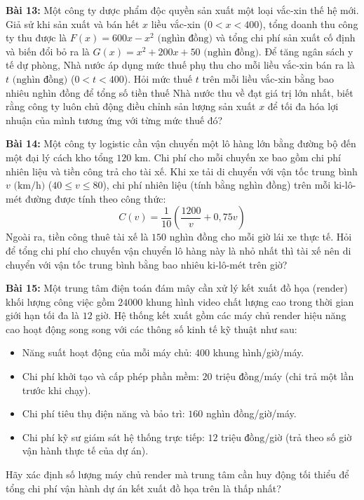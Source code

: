 \documentclass[12pt]{article}
\begin{document}
	\vspace{0.6cm}
	
	\noindent \textbf{Bài 13:} Một công ty dược phẩm độc quyền sản xuất một loại vắc-xin thế hệ mới. Giả sử khi sản xuất và bán hết $x$ liều vắc-xin ($0 < x < 400$), tổng doanh thu công ty thu được là $F(x) = 600x - x^2\text{ (nghìn đồng)}$ và tổng chi phí sản xuất cố định và biến đổi bỏ ra là $G(x) = x^2 + 200x + 50\text{ (nghìn đồng)}$. Để tăng ngân sách y tế dự phòng, Nhà nước áp dụng mức thuế phụ thu cho mỗi liều vắc-xin bán ra là $t\text{ (nghìn đồng)}$ ($0 < t < 400$). Hỏi mức thuế $t$ trên mỗi liều vắc-xin bằng bao nhiêu nghìn đồng để tổng số tiền thuế Nhà nước thu về đạt giá trị lớn nhất, biết rằng công ty luôn chủ động điều chỉnh sản lượng sản xuất $x$ để tối đa hóa lợi nhuận của mình tương ứng với từng mức thuế đó?
	\vspace{0.6cm}
	
	\noindent \textbf{Bài 14:} Một công ty logistic cần vận chuyển một lô hàng lớn bằng đường bộ đến một đại lý cách kho tổng $120\text{ km}$. Chi phí cho mỗi chuyến xe bao gồm chi phí nhiên liệu và tiền công trả cho tài xế. Khi xe tải di chuyển với vận tốc trung bình $v\text{ (km/h)}$ ($40 \le v \le 80$), chi phí nhiên liệu (tính bằng nghìn đồng) trên mỗi ki-lô-mét đường được tính theo công thức: 
	$$C(v) = \frac{1}{10}\left(\frac{1200}{v} + 0{,}75v\right)$$
	Ngoài ra, tiền công thuê tài xế là $150$ nghìn đồng cho mỗi giờ lái xe thực tế. Hỏi để tổng chi phí cho chuyến vận chuyển lô hàng này là nhỏ nhất thì tài xế nên di chuyển với vận tốc trung bình bằng bao nhiêu ki-lô-mét trên giờ?
	
	\vspace{0.6cm}
	
	\noindent \textbf{Bài 15:} Một trung tâm điện toán đám mây cần xử lý kết xuất đồ họa (render) khối lượng công việc gồm $24000$ khung hình video chất lượng cao trong thời gian giới hạn tối đa là $12$ giờ. Hệ thống kết xuất gồm các máy chủ render hiệu năng cao hoạt động song song với các thông số kinh tế kỹ thuật như sau:
	\begin{itemize}
		\item Năng suất hoạt động của mỗi máy chủ: $400$ khung hình/giờ/máy.
		\item Chi phí khởi tạo và cấp phép phần mềm: $20\text{ triệu đồng}$/máy (chi trả một lần trước khi chạy).
		\item Chi phí tiêu thụ điện năng và bảo trì: $160$ nghìn đồng/giờ/máy.
		\item Chi phí kỹ sư giám sát hệ thống trực tiếp: $12\text{ triệu đồng}$/giờ (trả theo số giờ vận hành thực tế của dự án).
	\end{itemize}
	Hãy xác định số lượng máy chủ render mà trung tâm cần huy động tối thiểu để tổng chi phí vận hành dự án kết xuất đồ họa trên là thấp nhất?
	
\end{document}
